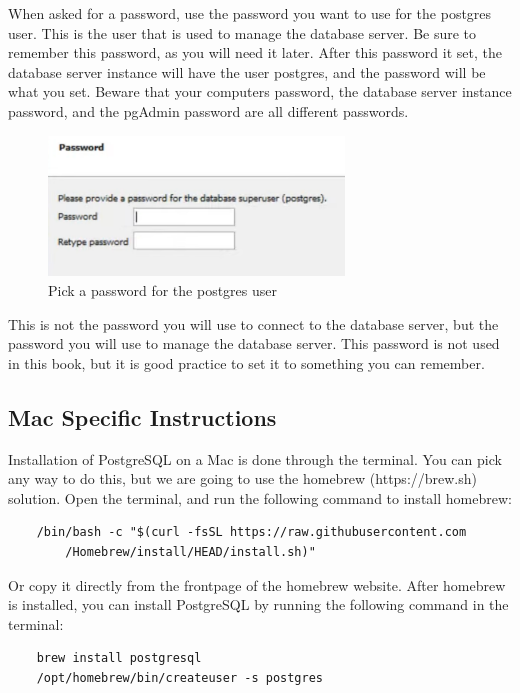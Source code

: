 When asked for a password, use the password you want to use for the postgres user. This is the user that is used to manage the database server. Be sure to remember this password, as you will need it later. After this password it set, the database server instance will have the user postgres, and the password will be what you set. Beware that your computers password, the database server instance password, and the pgAdmin password are all different passwords.

\begin{figure}[htb]
    \centering
    \includegraphics[width=0.7\textwidth]{content/1-relational-databases/figures/1.install-for-windows-3.png}
    \caption{Pick a password for the postgres user}
    \label{fig:1.postgresql-download-3.png}
\end{figure}


This is not the password you will use to connect to the database server, but the password you will use to manage the database server. This password is not used in this book, but it is good practice to set it to something you can remember.

\subsection{Mac Specific Instructions}
Installation of PostgreSQL on a Mac is done through the terminal. You can pick any way to do this, but we are going to use the homebrew (https://brew.sh) solution. Open the terminal, and run the following command to install homebrew: 

\begin{verbatim}
    /bin/bash -c "$(curl -fsSL https://raw.githubusercontent.com
        /Homebrew/install/HEAD/install.sh)"
\end{verbatim}

Or copy it directly from the frontpage of the homebrew website. After homebrew is installed, you can install PostgreSQL by running the following command in the terminal:

\begin{verbatim}
    brew install postgresql
    /opt/homebrew/bin/createuser -s postgres
\end{verbatim}

